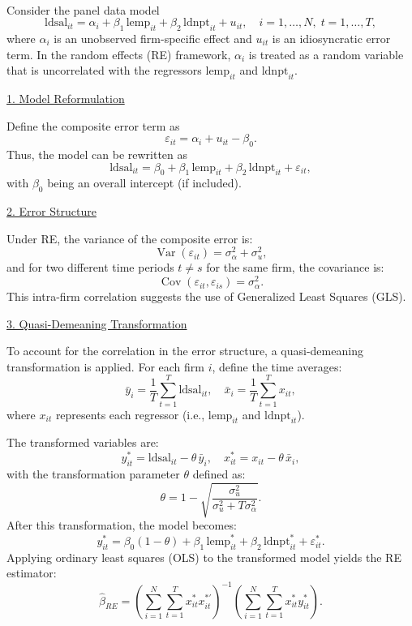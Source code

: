 \documentclass[a4paper,12pt]{article} %
\theoremstyle{nonitalic}
\newenvironment{solution}[1]
  {\renewcommand\theinnercustomsol{#1}\innercustomsol}
  {\endinnercustomsol}
\newcounter{solutionctr}
\renewcommand{\thesolutionctr}{(\alph{solutionctr})}
\newenvironment{autosolution}
  {\stepcounter{solutionctr}\begin{solution}{\thesolutionctr}}
  {\end{solution}}
\begin{document}
\begin{autosolution}
\

Consider the panel data model
\[
\text{ldsal}_{it} = \alpha_i + \beta_1\,\text{lemp}_{it} + \beta_2\,\text{ldnpt}_{it} + u_{it}, \quad i=1,\dots, N,\; t=1,\dots, T,
\]
where $\alpha_i$ is an unobserved firm-specific effect and $u_{it}$ is an idiosyncratic error term. In the random effects (RE) framework, $\alpha_i$ is treated as a random variable that is uncorrelated with the regressors $\text{lemp}_{it}$ and $\text{ldnpt}_{it}$.

\underline{1. Model Reformulation}

Define the composite error term as
\[
\varepsilon_{it} = \alpha_i + u_{it} - \beta_0.
\]
Thus, the model can be rewritten as
\[
\text{ldsal}_{it} = \beta_0 + \beta_1\,\text{lemp}_{it} + \beta_2\,\text{ldnpt}_{it} + \varepsilon_{it},
\]
with $\beta_0$ being an overall intercept (if included).

\underline{2. Error Structure}

Under RE, the variance of the composite error is:
\[
\operatorname{Var}(\varepsilon_{it}) = \sigma^2_\alpha + \sigma^2_u,
\]
and for two different time periods $t \neq s$ for the same firm, the covariance is:
\[
\operatorname{Cov}(\varepsilon_{it}, \varepsilon_{is}) = \sigma^2_\alpha.
\]
This intra-firm correlation suggests the use of Generalized Least Squares (GLS).

\underline{3. Quasi-Demeaning Transformation}

To account for the correlation in the error structure, a quasi-demeaning transformation is applied. For each firm $i$, define the time averages:
\[
\bar{y}_i = \frac{1}{T}\sum_{t=1}^{T} \text{ldsal}_{it}, \quad \bar{x}_i = \frac{1}{T}\sum_{t=1}^{T} x_{it},
\]
where $x_{it}$ represents each regressor (i.e., $\text{lemp}_{it}$ and $\text{ldnpt}_{it}$).

The transformed variables are:
\[
y^*_{it} = \text{ldsal}_{it} - \theta\,\bar{y}_i, \quad x^*_{it} = x_{it} - \theta\,\bar{x}_i,
\]
with the transformation parameter $\theta$ defined as:
\[
\theta = 1 - \sqrt{\frac{\sigma^2_u}{\sigma^2_u + T\sigma^2_\alpha}}.
\]
After this transformation, the model becomes:
\[
y^*_{it} = \beta_0(1-\theta) + \beta_1\,\text{lemp}^*_{it} + \beta_2\,\text{ldnpt}^*_{it} + \varepsilon^*_{it}.
\]
Applying ordinary least squares (OLS) to the transformed model yields the RE estimator:
\[
\hat{\beta}_{RE} = \left(\sum_{i=1}^{N}\sum_{t=1}^{T} x^*_{it}x^{*\prime}_{it}\right)^{-1}\left(\sum_{i=1}^{N}\sum_{t=1}^{T} x^*_{it}y^*_{it}\right).
\]


\end{autosolution}
\end{document}
